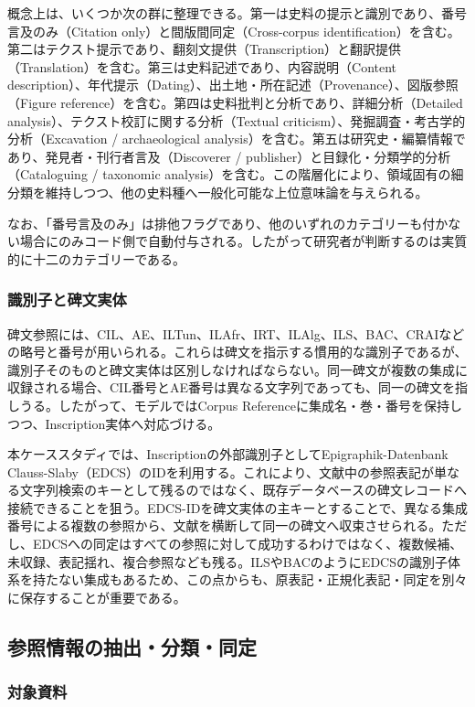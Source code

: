 概念上は、いくつか次の群に整理できる。第一は史料の提示と識別であり、番号言及のみ（Citation only）と間版間同定（Cross-corpus identification）を含む。第二はテクスト提示であり、翻刻文提供（Transcription）と翻訳提供（Translation）を含む。第三は史料記述であり、内容説明（Content description）、年代提示（Dating）、出土地・所在記述（Provenance）、図版参照（Figure reference）を含む。第四は史料批判と分析であり、詳細分析（Detailed analysis）、テクスト校訂に関する分析（Textual criticism）、発掘調査・考古学的分析（Excavation / archaeological analysis）を含む。第五は研究史・編纂情報であり、発見者・刊行者言及（Discoverer / publisher）と目録化・分類学的分析（Cataloguing / taxonomic analysis）を含む。この階層化により、領域固有の細分類を維持しつつ、他の史料種へ一般化可能な上位意味論を与えられる。

なお、「番号言及のみ」は排他フラグであり、他のいずれのカテゴリーも付かない場合にのみコード側で自動付与される。したがって研究者が判断するのは実質的に十二のカテゴリーである。

\subsubsection{識別子と碑文実体}

碑文参照には、CIL、AE、ILTun、ILAfr、IRT、ILAlg、ILS、BAC、CRAIなどの略号と番号が用いられる。これらは碑文を指示する慣用的な識別子であるが、識別子そのものと碑文実体は区別しなければならない。同一碑文が複数の集成に収録される場合、CIL番号とAE番号は異なる文字列であっても、同一の碑文を指しうる。したがって、モデルではCorpus Referenceに集成名・巻・番号を保持しつつ、Inscription実体へ対応づける。

本ケーススタディでは、Inscriptionの外部識別子としてEpigraphik-Datenbank Clauss-Slaby（EDCS）のIDを利用する。これにより、文献中の参照表記が単なる文字列検索のキーとして残るのではなく、既存データベースの碑文レコードへ接続できることを狙う。EDCS-IDを碑文実体の主キーとすることで、異なる集成番号による複数の参照から、文献を横断して同一の碑文へ収束させられる。ただし、EDCSへの同定はすべての参照に対して成功するわけではなく、複数候補、未収録、表記揺れ、複合参照なども残る。ILSやBACのようにEDCSの識別子体系を持たない集成もあるため、この点からも、原表記・正規化表記・同定を別々に保存することが重要である。

\subsection{参照情報の抽出・分類・同定}

\subsubsection{対象資料}

